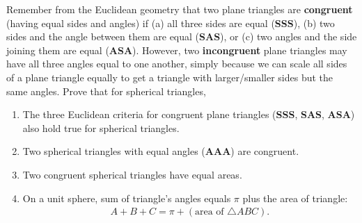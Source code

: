 \begin{tcolorbox}[title={Congruent Spherical Triangles \& Gauss--Bonnet Theorem}]
    \begin{question}
        Remember from the Euclidean geometry that two plane triangles are \textbf{congruent} (having equal sides and angles) if (a) all three sides are equal (\textbf{SSS}), (b) two sides and the angle between them are equal (\textbf{SAS}), or (c) two angles and the side joining them are equal (\textbf{ASA}). However, two \textbf{incongruent} plane triangles may have all three angles equal to one another, simply because we can scale all sides of a plane triangle equally to get a triangle with larger/smaller sides but the same angles. Prove that for spherical triangles,
    \begin{enumerate}
        \item The three Euclidean criteria for congruent plane triangles (\textbf{SSS}, \textbf{SAS}, \textbf{ASA}) also hold true for spherical triangles.
        \item Two spherical triangles with equal angles (\textbf{AAA}) are congruent.
        \item Two congruent spherical triangles have equal areas.
        \item On a unit sphere, sum of triangle's angles equals $\pi$ plus the area of triangle:
        \begin{align*}
            A + B + C = \pi + (\text{area of }\triangle ABC).
        \end{align*}
    \end{enumerate}
    \end{question}
\end{tcolorbox}

